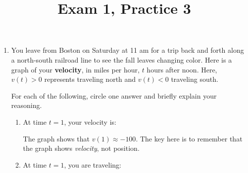 \documentclass{article}
\theoremstyle{theorem}
\begin{document}
  \title{Exam 1, Practice 3}


\listofproblems

\begin{enumerate}
\item \label{fall2012-1a-midterm1-2a}  

  You leave from Boston on Saturday at 11 am for a trip back and forth
  along a north-south railroad line to see the fall leaves changing color.
  Here is a graph of your \textbf{velocity}, in miles per hour, $t$ hours
  after noon.  Here, $v(t) > 0$ represents traveling north and $v(t) <0$
  traveling south.

  \begin{center}
  \end{center}

  For each of the following, circle one answer and briefly explain your
  reasoning.
  \begin{enumerate}
  \item \label{fall2012-1a-midterm1-2a-i}
    \begin{problem}[\vfill]
      At time $t = 1$, your velocity is: \qquad {}
      \qquad {} \qquad {} \qquad

    \end{problem}

    \begin{solution}
      The graph shows that $v(1) \approx -100$. The key here is to remember that the graph shows \emph{velocity}, not position. 
    \end{solution}

  \item
    \begin{problem}[\vfill]
      At time $t = 1$, you are traveling: \qquad {}
      \qquad {} \qquad {}


\end{problem}
\end{enumerate}
\end{enumerate}
\end{document}
